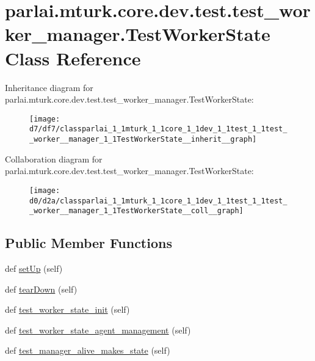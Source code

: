\hypertarget{classparlai_1_1mturk_1_1core_1_1dev_1_1test_1_1test__worker__manager_1_1TestWorkerState}{}\section{parlai.\+mturk.\+core.\+dev.\+test.\+test\+\_\+worker\+\_\+manager.\+Test\+Worker\+State Class Reference}
\label{classparlai_1_1mturk_1_1core_1_1dev_1_1test_1_1test__worker__manager_1_1TestWorkerState}


Inheritance diagram for parlai.\+mturk.\+core.\+dev.\+test.\+test\+\_\+worker\+\_\+manager.\+Test\+Worker\+State\+:
\nopagebreak
\begin{figure}[H]
\begin{center}
\leavevmode
\texttt{[image: d7/df7/classparlai\_1\_1mturk\_1\_1core\_1\_1dev\_1\_1test\_1\_1test\_\_worker\_\_manager\_1\_1TestWorkerState\_\_inherit\_\_graph]}
\end{center}
\end{figure}


Collaboration diagram for parlai.\+mturk.\+core.\+dev.\+test.\+test\+\_\+worker\+\_\+manager.\+Test\+Worker\+State\+:
\nopagebreak
\begin{figure}[H]
\begin{center}
\leavevmode
\texttt{[image: d0/d2a/classparlai\_1\_1mturk\_1\_1core\_1\_1dev\_1\_1test\_1\_1test\_\_worker\_\_manager\_1\_1TestWorkerState\_\_coll\_\_graph]}
\end{center}
\end{figure}
\subsection*{Public Member Functions}
\begin{DoxyCompactItemize}
\item 
def \hyperlink{classparlai_1_1mturk_1_1core_1_1dev_1_1test_1_1test__worker__manager_1_1TestWorkerState_a4f201bda00265bf7f8be515b87f2ab4d}{set\+Up} (self)
\item 
def \hyperlink{classparlai_1_1mturk_1_1core_1_1dev_1_1test_1_1test__worker__manager_1_1TestWorkerState_af37aad66ce19bc0b823d2153977bcf1e}{tear\+Down} (self)
\item 
def \hyperlink{classparlai_1_1mturk_1_1core_1_1dev_1_1test_1_1test__worker__manager_1_1TestWorkerState_aa8a9f7fe801eb68ee6728fe3f0fc134d}{test\+\_\+worker\+\_\+state\+\_\+init} (self)
\item 
def \hyperlink{classparlai_1_1mturk_1_1core_1_1dev_1_1test_1_1test__worker__manager_1_1TestWorkerState_af846b12c568c82ed66282317397a772c}{test\+\_\+worker\+\_\+state\+\_\+agent\+\_\+management} (self)
\item 
def \hyperlink{classparlai_1_1mturk_1_1core_1_1dev_1_1test_1_1test__worker__manager_1_1TestWorkerState_afe50066a7195e71570e7d60e95ac2ada}{test\+\_\+manager\+\_\+alive\+\_\+makes\+\_\+state} (self)
\end{DoxyCompactItemize}
